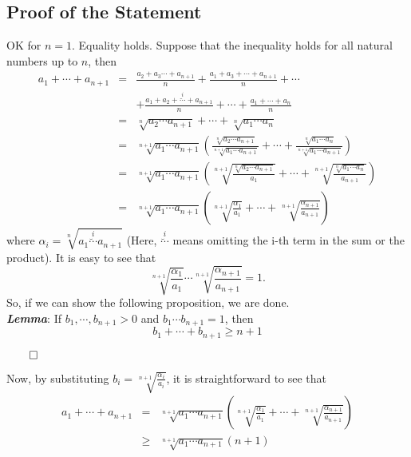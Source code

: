 \documentclass{article}
\begin{document}
\subsection{Proof of the Statement}
\label{sec-1-2}
OK for $n=1$. Equality holds. Suppose that the inequality holds for all natural numbers up to $n$, then
\begin{eqnarray*}
a_1 + \cdots + a_{n+1} & = & \frac{a_2 + a_3 \cdots + a_{n+1}}{n} + \frac{a_1 + a_3 + \cdots + a_{n+1}}{n} + \cdots  \nonumber \\
                       &  &  + \frac{a_1 + a_2 + \overset{i}{\breve{\cdots} } + a_{n+1}}{n} + \cdots + \frac{a_1 + \cdots + a_{n}}{n}\nonumber\\
                       & = &  \sqrt[n]{a_2\cdots a_{n+1}} + \cdots + \sqrt[n]{a_1\cdots a_n} \nonumber \\
                       & = &  \sqrt[n+1]{a_1\cdots a_{n+1}} \left( \frac{\sqrt[n]{a_2\cdots a_{n+1}}}{\sqrt[n+1]{a_1\cdots a_{n+1}}} + \cdots + \frac{\sqrt[n]{a_1\cdots a_n}}{\sqrt[n+1]{a_1\cdots a_{n+1}}} \right) \nonumber \\
                       & = &  \sqrt[n+1]{a_1\cdots a_{n+1}} \left( \sqrt[n+1]{\frac{\sqrt[n]{a_2\cdots a_{n+1}}}{a_1}} + \cdots + \sqrt[n+1]{\frac{\sqrt[n]{a_1\cdots a_{n}}}{a_{n+1}}}\right) \nonumber \\
                       & = &  \sqrt[n+1]{a_1\cdots a_{n+1}} \left( \sqrt[n+1]{\frac{\alpha_1}{a_1}} + \cdots + \sqrt[n+1]{\frac{\alpha_{n+1}}{a_{n+1}}}\right) 
\end{eqnarray*}
where $\alpha_i=\sqrt[n]{a_1\overset{i}{\breve{\cdots}} a_{n+1}}$ (Here, $\overset{i}{\breve{\cdots}}$ means omitting the i-th term in the sum or the product). It is easy to see that
\begin{equation*}
\label{ }
\sqrt[n+1]{\frac{\alpha_1}{a_1}}  \cdots  \sqrt[n+1]{\frac{\alpha_{n+1}}{a_{n+1}}} = 1.
\end{equation*}
So, if we can show the following proposition, we are done.\\
\textbf{\emph{Lemma}}:
 If $b_1, \cdots, b_{n+1} >0$ and $b_1 \cdots b_{n+1} = 1$, then
\begin{equation}
\label{AM_GM_normalised}
b_1 + \cdots + b_{n+1} \ge n+1
\end{equation}
\begin{right}
$\qed$
\end{right}

Now, by substituting $b_i = \sqrt[n+1]{\frac{\alpha_i}{a_i}}$, it is straightforward to see that
\begin{eqnarray*}
a_1 + \cdots + a_{n+1} & = &  \sqrt[n+1]{a_1\cdots a_{n+1}} \left( \sqrt[n+1]{\frac{\alpha_1}{a_1}} + \cdots + \sqrt[n+1]{\frac{\alpha_{n+1}}{a_{n+1}}}\right) \nonumber \\
                       & \ge &  \sqrt[n+1]{a_1\cdots a_{n+1}} (n + 1 ) \nonumber \\
\end{eqnarray*}
\end{document}
